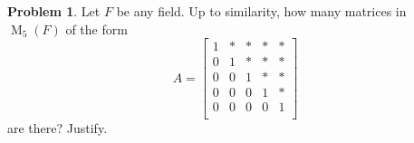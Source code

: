 \documentclass[11pt]{article}
\DeclareMathOperator{\M}{M}
\theoremstyle{definition}
\newtheorem{problem}{Problem}
\begin{document}
\begin{problem}
Let $F$ be any field. Up to similarity, how many matrices in $\M_{5}(F)$ of the form
$$A = \begin{bmatrix}
    1 & * & * & * & * \\
    0 & 1 & * & * & * \\
    0 & 0 & 1 & * & * \\
    0 & 0 & 0 & 1 & * \\
    0 & 0 & 0 & 0 & 1 \\
\end{bmatrix}$$
are there? Justify. 
\end{problem}
\end{document}

